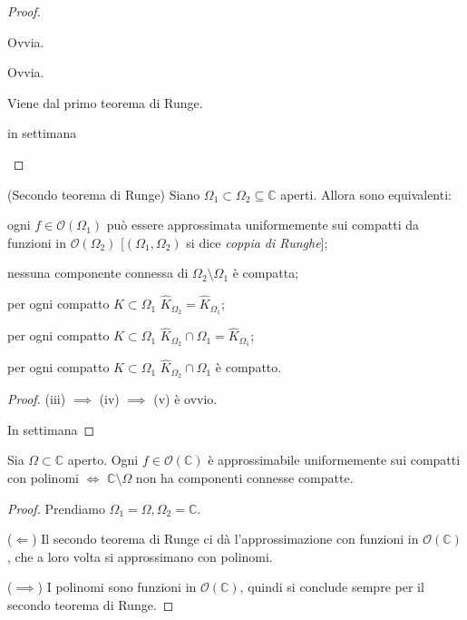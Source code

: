 \begin{proof}
  \begin{nlist}
    \item Ovvia.
    \item Ovvia.
    \item Viene dal primo teorema di Runge.
    \item in settimana
  \end{nlist}
\end{proof}

\begin{thm}
  (Secondo teorema di Runge) Siano $\Omega_1 \subset \Omega_2 \subseteq \mathbb{C}$ aperti. Allora sono equivalenti:
  \begin{nlist}
    \item ogni $f \in \mathcal{O}(\Omega_1)$ può essere approssimata uniformemente sui compatti da funzioni in $\mathcal{O}(\Omega_2)$ [$(\Omega_1, \Omega_2)$ si dice \textit{coppia di Runghe}];
    \item nessuna componente connessa di $\Omega_2\setminus\Omega_1$ è compatta;
    \item per ogni compatto $K \subset \Omega_1$ $\widehat{K}_{\Omega_2}=\widehat{K}_{\Omega_1}$;
    \item per ogni compatto $K \subset \Omega_1$ $\widehat{K}_{\Omega_2}\cap \Omega_1=\widehat{K}_{\Omega_1}$;
    \item per ogni compatto $K \subset \Omega_1$ $\widehat{K}_{\Omega_2}\cap \Omega_1$ è compatto.
  \end{nlist}
\end{thm}

\begin{proof}
  (iii) $\implies$ (iv) $\implies$ (v) è ovvio.

  In settimana
\end{proof}

\begin{cor}
  Sia $\Omega \subset \mathbb{C}$ aperto. Ogni $f \in \mathcal{O}(\mathbb{C})$ è approssimabile uniformemente sui compatti con polinomi $\iff$ $\mathbb{C}\setminus \Omega$ non ha componenti connesse compatte.
\end{cor}

\begin{proof}
  Prendiamo $\Omega_1=\Omega, \Omega_2=\mathbb{C}$.

  ($\Leftarrow$) Il secondo teorema di Runge ci dà l'approssimazione con funzioni in $\mathcal{O}(\mathbb{C})$, che a loro volta si approssimano con polinomi.

  ($\implies$) I polinomi sono funzioni in $\mathcal{O}(\mathbb{C})$, quindi si conclude sempre per il secondo teorema di Runge.
\end{proof}

